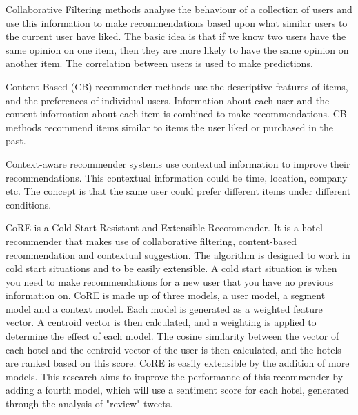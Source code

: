Collaborative Filtering methods analyse the behaviour of a collection of users and use this information to make recommendations based upon what similar users to the current user have liked. The basic idea is that if we know two users have the same opinion on one item, then they are more likely to have the same opinion on another item. The correlation between users is used to make predictions.

Content-Based (CB) recommender methods use the descriptive features of items, and the preferences of individual users. Information about each user and the content information about each item is combined to make recommendations. CB methods recommend items similar to items the user liked or purchased in the past.

Context-aware recommender systems use contextual information to improve their recommendations. This contextual information could be time, location, company etc. The concept is that the same user could prefer different items under different conditions.

CoRE \cite{core2019} is a Cold Start Resistant and Extensible Recommender. It is a hotel recommender that makes use of collaborative filtering, content-based recommendation and contextual suggestion. The algorithm is designed to work in cold start situations and to be easily extensible. A cold start situation is when you need to make recommendations for a new user that you have no previous information on. CoRE is made up of three models, a user model, a segment model and a context model. Each model is generated as a weighted feature vector. A centroid vector is then calculated, and a weighting is applied to determine the effect of each model. The cosine similarity between the vector of each hotel and the centroid vector of the user is then calculated, and the hotels are ranked based on this score.
CoRE is easily extensible by the addition of more models. This research aims to improve the performance of this recommender by adding a fourth model, which will use a sentiment score for each hotel, generated through the analysis of "review"
tweets. 

